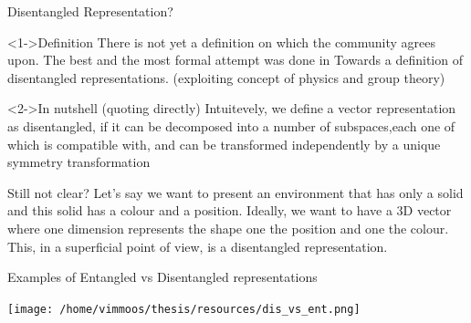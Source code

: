 \documentclass[presentation]{beamer}
\begin{document}
\begin{frame}[label={sec:org433e658}]{Disentangled Representation?}
\begin{block}<1->{Definition}
There is not yet a definition on which the community agrees upon.
The best and the most formal attempt was done in Towards a definition of
disentangled representations. (exploiting concept of physics and group
theory)
\end{block}
\begin{block}<2->{In nutshell (quoting directly)}
Intuitevely, we define a vector representation as disentangled, if it
can be decomposed into a number of subspaces,each one of which is
compatible with, and can be transformed independently by a unique
symmetry transformation
\end{block}
\end{frame}

\begin{frame}[label={sec:orgda38cbd}]{Still not clear?}
Let's say we want to present an environment that has only a solid
and this solid has a colour and a position.
Ideally, we want to have a 3D vector where one dimension represents the
shape one the position and one the colour. This, in a superficial point
of view, is a disentangled representation.
\end{frame}

\begin{frame}[label={sec:org312001e}]{Examples of Entangled vs Disentangled representations}
\begin{center}
\texttt{[image: /home/vimmoos/thesis/resources/dis\_vs\_ent.png]}
\end{center}
\end{frame}
\end{document}
